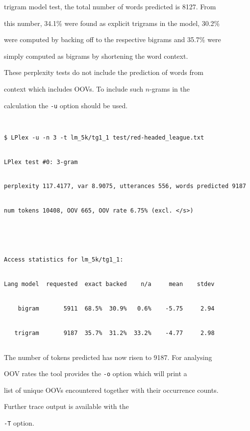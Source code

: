 trigram model test, the total number of words predicted is 8127. From


this number, 34.1\% were found as explicit trigrams in the model, 30.2\%


were computed by backing off to the respective bigrams and 35.7\% were


simply computed as bigrams by shortening the word context.





These perplexity tests do not include the prediction of words from


context which includes OOVs. To include such $n$-grams in the 


calculation the \texttt{-u} option should be used.


\begin{verbatim}


$ LPlex -u -n 3 -t lm_5k/tg1_1 test/red-headed_league.txt 


LPlex test #0: 3-gram


perplexity 117.4177, var 8.9075, utterances 556, words predicted 9187


num tokens 10408, OOV 665, OOV rate 6.75% (excl. </s>)





Access statistics for lm_5k/tg1_1:


Lang model  requested  exact backed    n/a     mean    stdev


    bigram       5911  68.5%  30.9%   0.6%    -5.75     2.94


   trigram       9187  35.7%  31.2%  33.2%    -4.77     2.98


\end{verbatim} %


The number of tokens predicted has now risen to 9187.  For analysing


OOV rates the tool provides the \texttt{-o} option which will print a


list of unique OOVs encountered together with their occurrence counts.


Further trace output is available with the


\texttt{-T} option.












